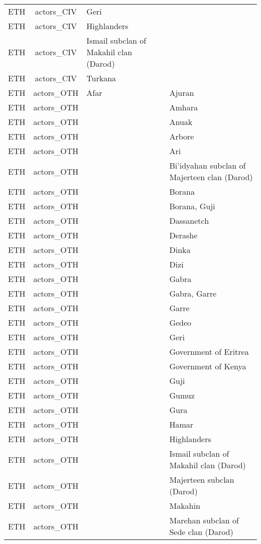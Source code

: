 \documentclass[12pt]{article}
\begin{document}
\begin{center}
\begin{longtable}{|c|c|p{7cm}|p{7cm}|}
  ETH & actors\_CIV & Geri &  \\ 
  ETH & actors\_CIV & Highlanders &  \\ 
  ETH & actors\_CIV & Ismail subclan of Makahil clan (Darod) &  \\ 
  ETH & actors\_CIV & Turkana &  \\ 
  ETH & actors\_OTH & Afar & Ajuran \\ 
  ETH & actors\_OTH &  & Amhara \\ 
  ETH & actors\_OTH &  & Anuak \\ 
  ETH & actors\_OTH &  & Arbore \\ 
  ETH & actors\_OTH &  & Ari \\ 
  ETH & actors\_OTH &  & Bi'idyahan subclan of Majerteen clan (Darod) \\ 
  ETH & actors\_OTH &  & Borana \\ 
  ETH & actors\_OTH &  & Borana, Guji \\ 
  ETH & actors\_OTH &  & Dassanetch \\ 
  ETH & actors\_OTH &  & Derashe \\ 
  ETH & actors\_OTH &  & Dinka \\ 
  ETH & actors\_OTH &  & Dizi \\ 
  ETH & actors\_OTH &  & Gabra \\ 
  ETH & actors\_OTH &  & Gabra, Garre \\ 
  ETH & actors\_OTH &  & Garre \\ 
  ETH & actors\_OTH &  & Gedeo \\ 
  ETH & actors\_OTH &  & Geri \\ 
  ETH & actors\_OTH &  & Government of Eritrea \\ 
  ETH & actors\_OTH &  & Government of Kenya \\ 
  ETH & actors\_OTH &  & Guji \\ 
  ETH & actors\_OTH &  & Gumuz \\ 
  ETH & actors\_OTH &  & Gura \\ 
  ETH & actors\_OTH &  & Hamar \\ 
  ETH & actors\_OTH &  & Highlanders \\ 
  ETH & actors\_OTH &  & Ismail subclan of Makahil clan (Darod) \\ 
  ETH & actors\_OTH &  & Majerteen subclan (Darod) \\ 
  ETH & actors\_OTH &  & Makahin \\ 
  ETH & actors\_OTH &  & Marehan subclan of Sede clan (Darod) \\ 

\end{longtable}
\end{center}
\end{document}

